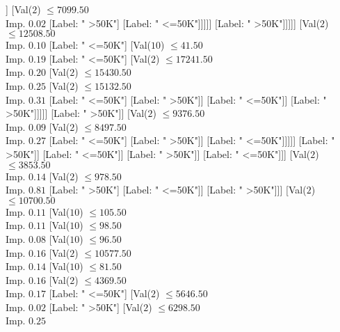 \documentclass[margin=10pt]{standalone}
\begin{document}
\begin{forest}
																								[Label: " <=50K"]
																								[Label: " >50K"]]
																							[Val($2$) $ \leq 7099.50$ \\ Imp. $0.02$
																								[Label: " >50K"]
																								[Label: " <=50K"]]]]]
																				[Label: " >50K"]]]]]
																[Val($2$) $ \leq 12508.50$ \\ Imp. $0.10$
																	[Label: " <=50K"]
																	[Val($10$) $ \leq 41.50$ \\ Imp. $0.19$
																		[Label: " <=50K"]
																		[Val($2$) $ \leq 17241.50$ \\ Imp. $0.20$
																			[Val($2$) $ \leq 15430.50$ \\ Imp. $0.25$
																				[Val($2$) $ \leq 15132.50$ \\ Imp. $0.31$
																					[Label: " <=50K"]
																					[Label: " >50K"]]
																				[Label: " <=50K"]]
																			[Label: " >50K"]]]]]
															[Label: " >50K"]]
														[Val($2$) $ \leq 9376.50$ \\ Imp. $0.09$
															[Val($2$) $ \leq 8497.50$ \\ Imp. $0.27$
																[Label: " <=50K"]
																[Label: " >50K"]]
															[Label: " <=50K"]]]]]
											[Label: " >50K"]]
										[Label: " <=50K"]]
									[Label: " >50K"]]
								[Label: " <=50K"]]]
						[Val($2$) $ \leq 3853.50$ \\ Imp. $0.14$
							[Val($2$) $ \leq 978.50$ \\ Imp. $0.81$
								[Label: " >50K"]
								[Label: " <=50K"]]
							[Label: " >50K"]]]
					[Val($2$) $ \leq 10700.50$ \\ Imp. $0.11$
						[Val($10$) $ \leq 105.50$ \\ Imp. $0.11$
							[Val($10$) $ \leq 98.50$ \\ Imp. $0.08$
								[Val($10$) $ \leq 96.50$ \\ Imp. $0.16$
									[Val($2$) $ \leq 10577.50$ \\ Imp. $0.14$
										[Val($10$) $ \leq 81.50$ \\ Imp. $0.16$
											[Val($2$) $ \leq 4369.50$ \\ Imp. $0.17$
												[Label: " <=50K"]
												[Val($2$) $ \leq 5646.50$ \\ Imp. $0.02$
													[Label: " >50K"]
													[Val($2$) $ \leq 6298.50$ \\ Imp. $0.25$

\end{forest}
\end{document}
